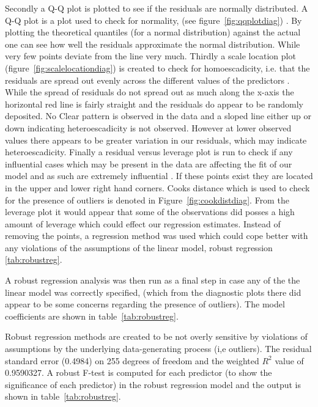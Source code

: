 Secondly a Q-Q plot is plotted to see if the residuals are normally distributed. A Q-Q plot is a plot used to check for normality, (see figure~\ref{fig:qqplotdiag}) . By plotting the theoretical quantiles (for a normal distribution) against the actual one can see how well the residuals approximate the normal distribution. While very few points deviate from the line very much. Thirdly a scale location plot (figure~\ref{fig:scalelocationdiag}) is created to check for homoescadicity, i.e. that the residuals are spread out evenly across the different values of the predictors \citep{neter1996applied}. While the spread of residuals do not  spread out as much along the x-axis the horizontal red line is fairly straight and the residuals do appear to be randomly deposited. No Clear pattern is observed in the data and a sloped line either up or down indicating heteroescadicity is not observed. However at lower observed values there appears to be greater variation in our residuals, which may indicate heteroescadicity. Finally a residual versus leverage plot is run to check if any influential cases which may be present in the data are affecting the fit of our model and as such are extremely influential \citep{sall1990leverage}. If these points exist they are located in the upper and lower right hand corners. Cooks distance \citep{chatterjee2009sensitivity} which is used to check for the presence of outliers is denoted in Figure~\ref{fig:cookdistdiag}. From the leverage plot it would appear that some of the observations did posses a high amount of leverage which could effect our regression estimates. Instead of removing the points, a regression method was used which could cope better with any violations of the assumptions of the linear model, robust regression \ref{tab:robustreg}.

A robust regression analysis \citep{rousseeuw2005robust} was then run as a final step in case any of the  the linear model was correctly specified, (which from the diagnostic plots there did appear to be some concerns regarding the presence of outliers). The model coefficients are shown in table~\ref{tab:robustreg}. 

Robust regression methods are created to be not overly sensitive by violations of assumptions by the underlying data-generating process (i,e outliers). The residual standard error (0.4984) on 255 degrees of freedom and the weighted $R^2$ value of 0.9590327. A robust F-test is computed for each predictor (to show the significance of each predictor) in the robust regression model and the output is shown in table~\ref{tab:robustreg}.

